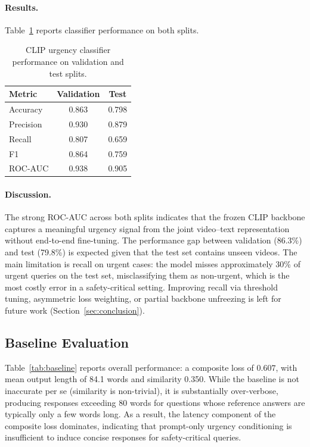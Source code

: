\documentclass{article}
\begin{document}
\paragraph{Results.}

Table~\ref{tab:classifier} reports classifier performance on both splits.

\begin{table}[H]
\centering
\caption{CLIP urgency classifier performance on validation and test splits.}
\label{tab:classifier}
\begin{tabular}{lcc}
\toprule
\textbf{Metric} & \textbf{Validation} & \textbf{Test} \\
\midrule
Accuracy  & 0.863 & 0.798 \\
Precision & 0.930  & 0.879   \\
Recall    & 0.807   & 0.659 \\
F1        & 0.864   & 0.759 \\
ROC-AUC   & 0.938  & 0.905 \\
\bottomrule
\end{tabular}
\end{table}

\paragraph{Discussion.}
The strong ROC-AUC across both splits indicates that the frozen CLIP backbone captures a meaningful urgency signal from the joint video--text representation without end-to-end fine-tuning. The performance gap between validation (86.3\%) and test (79.8\%) is expected given that the test set contains unseen videos. The main limitation is recall on urgent cases: the model misses approximately 30\% of urgent queries on the test set, misclassifying them as non-urgent, which is the most costly error in a safety-critical setting. Improving recall via threshold tuning, asymmetric loss weighting, or partial backbone unfreezing is left for future work (Section~\ref{sec:conclusion}).

\subsection{Baseline Evaluation}\label{sec:baseline_results}

Table~\ref{tab:baseline} reports overall performance: a composite loss of $0.607$, with mean output length of 84.1 words and similarity 0.350. While the baseline is not inaccurate per se (similarity is non-trivial), it is substantially over-verbose, producing responses exceeding 80 words for questions whose reference answers are typically only a few words long. As a result, the latency component of the composite loss dominates, indicating that prompt-only urgency conditioning is insufficient to induce concise responses for safety-critical queries.
\end{document}
